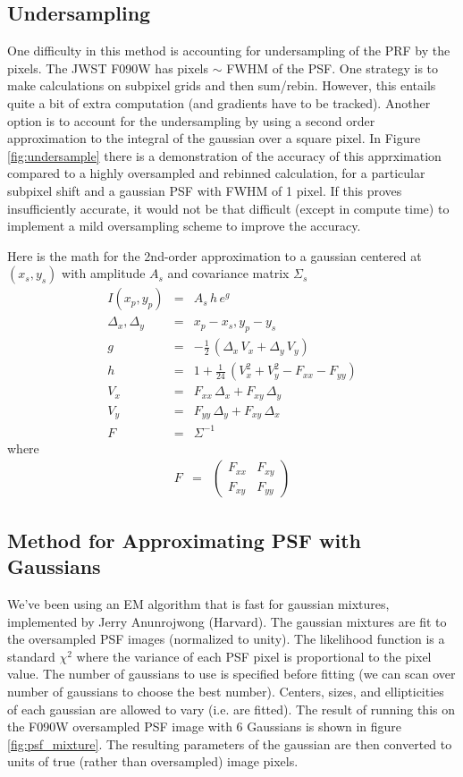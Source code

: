 \documentclass[modern]{aastex6}
\newcommand{\dx}{\Delta_x}
\newcommand{\dy}{\Delta_y}
\begin{document}
\subsection{Undersampling}
One difficulty in this method is accounting for undersampling of the PRF by the pixels.
The JWST F090W has pixels $\sim$ FWHM of the PSF.
One strategy is to make calculations on subpixel grids and then sum/rebin.
However, this entails quite a bit of extra computation (and gradients have to be tracked).
Another option is to account for the undersampling by using a second order approximation to the integral of the gaussian over a square pixel.
In Figure \ref{fig:undersample} there is a demonstration of the accuracy of this apprximation compared to a highly oversampled and rebinned calculation, for a particular subpixel shift and a gaussian PSF with FWHM of 1 pixel.
If this proves insufficiently accurate, it would not be that difficult (except in compute time) to implement a mild oversampling scheme to improve the accuracy.

Here is the math for the 2nd-order approximation to a gaussian centered at $(x_s, y_s)$ with amplitude $A_s$ and covariance matrix $\Sigma_s$
\begin{eqnarray}
I(x_p, y_p)   & = & A_s \, h \, e^{g } \\
\dx, \dy & = & x_p - x_s, y_p - y_s  \nonumber\\
g     & = & -\frac{1}{2} \, (\dx \, V_{x} + \dy \, V_y) \nonumber \\
h     & = & 1 + \frac{1}{24} \, (V_x^2 + V_y^2 - F_{xx} - F_{yy}) \nonumber \\
V_x  & = & F_{xx} \, \dx + F_{xy} \, \dy  \nonumber \\
V_y  & = & F_{yy} \, \dy + F_{xy} \, \dx \nonumber \\
F & = & \Sigma^{-1}  \nonumber
\end{eqnarray}
where
\begin{eqnarray}
F  & = & \begin{pmatrix} F_{xx} & F_{xy} \\ F_{xy} & F_{yy} \end{pmatrix}%
\end{eqnarray}


\subsection{Method for Approximating PSF with Gaussians}
We've been using an EM algorithm that is fast for gaussian mixtures, implemented by Jerry Anunrojwong (Harvard). 
The gaussian mixtures are fit to the oversampled PSF images (normalized to unity).
The likelihood function is a standard $\chi^2$ where the variance of each PSF pixel is proportional to the pixel value.
The number of gaussians to use is specified before fitting (we can scan over number of gaussians to choose the best number).
Centers, sizes, and ellipticities of each gaussian are allowed to vary (i.e. are fitted).
The result of running this on the F090W oversampled PSF image with 6 Gaussians is shown in figure \ref{fig:psf_mixture}.
The resulting parameters of the gaussian are then converted to units of true (rather than oversampled) image pixels.
\end{document}
